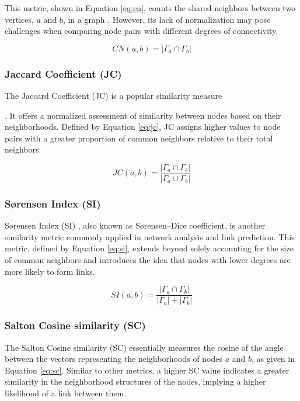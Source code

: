 This metric, shown in Equation \ref{eq:cn}, counts the shared neighbors between two vertices, $a$ and $b$, in a graph \cite{newman2001clustering}. However, its lack of normalization may pose challenges when comparing node pairs with different degrees of connectivity.

\begin{equation}
\label{eq:cn}
  CN(a, b) = |\Gamma_a \cap \Gamma_b|
\end{equation}


\subsubsection{Jaccard Coefficient (JC)}

The Jaccard Coefficient (JC) \cite{jaccard1901etude} is a popular similarity measure. It offers a normalized assessment of similarity between nodes based on their neighborhoods. Defined by Equation \ref{eq:jc}, JC assigns higher values to node pairs with a greater proportion of common neighbors relative to their total neighbors.

\begin{equation}
\label{eq:jc}
  JC(a, b) = \frac{|\Gamma_a \cap \Gamma_b|}{|\Gamma_a \cup \Gamma_b|}
\end{equation}


\subsubsection{S{\o}rensen Index (SI)}

S{\o}rensen Index (SI) \cite{sorensen1948method}, also known as S{\o}rensen–Dice coefficient, is another similarity metric commonly applied in network analysis and link prediction. This metric, defined by Equation \ref{eq:si}, extends beyond solely accounting for the size of common neighbors and introduces the idea that nodes with lower degrees are more likely to form links.

\begin{equation}
\label{eq:si}
  SI(a, b) = \frac{|\Gamma_a \cap \Gamma_b|}{|\Gamma_a| + |\Gamma_b|}
\end{equation}


\subsubsection{Salton Cosine similarity (SC)}

The Salton Cosine similarity (SC) \cite{salton1973specification} essentially measures the cosine of the angle between the vectors representing the neighborhoods of nodes $a$ and $b$, as given in Equation \ref{eq:sc}. Similar to other metrics, a higher SC value indicates a greater similarity in the neighborhood structures of the nodes, implying a higher likelihood of a link between them.

